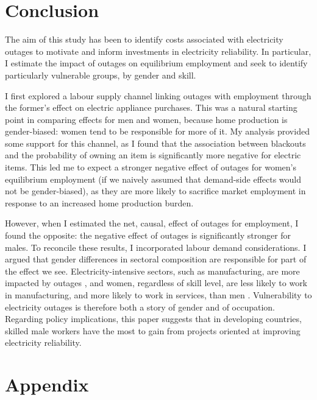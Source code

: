\documentclass[12pt]{article}
\begin{document}
\section{Conclusion} \label{sec:conclusion}
The aim of this study has been to identify costs associated with electricity outages to motivate and inform investments in electricity reliability. In particular, I estimate the impact of outages on equilibrium employment and seek to identify particularly vulnerable groups, by gender and skill.
\par
I first explored a labour supply channel linking outages with employment through the former's effect on electric appliance purchases. This was a natural starting point in comparing effects for men and women, because home production is gender-biased: women tend to be responsible for more of it. My analysis provided some support for this channel, as I found that the association between blackouts and the probability of owning an item is significantly more negative for electric items. This led me to expect a stronger negative effect of outages for women's equilibrium employment (if we naively assumed that demand-side effects would not be gender-biased), as they are more likely to sacrifice market employment in response to an increased home production burden. 
\par
However, when I estimated the net, causal, effect of outages for employment, I found the opposite: the negative effect of outages is significantly stronger for males. To reconcile these results, I incorporated labour demand considerations. I argued that gender differences in sectoral composition are responsible for part of the effect we see. Electricity-intensive sectors, such as manufacturing, are more impacted by outages \cite{alam2013a}, and women, regardless of skill level, are less likely to work in manufacturing, and more likely to work in services, than men \cite{baccini2021a}. Vulnerability to electricity outages is therefore both a story of gender and of occupation. Regarding policy implications, this paper suggests that in developing countries, skilled male workers have the most to gain from projects oriented at improving electricity reliability.

\newpage
\section{Appendix}
\end{document}
